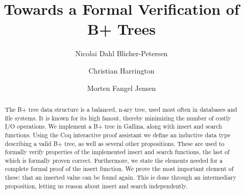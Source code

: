 \documentclass[oribibl]{llncs}
\begin{document}
\mainmatter
\title{Towards a Formal Verification of B+ Trees}
\author{Nicolai Dahl Blicher-Petersen \and Christian Harrington \and Morten Fangel Jensen \\
}

\maketitle

\begin{abstract}
The B+ tree data structure is a balanced, n-ary tree, used most often in databases and file systems. It is known for its high fanout, thereby minimizing the number of costly I/O operations. We implement a B+ tree in Gallina, along with insert and search functions. Using the Coq interactive proof assistant we define an inductive data type describing a valid B+ tree, as well as several other propositions. These are used to formally verify properties of the implemented insert and search functions, the last of which is formally proven correct. Furthermore, we state the elements needed for a complete formal proof of the insert function. We prove the most important element of these: that an inserted value can be found again. This is done through an intermediary proposition, letting us reason about insert and search independently.

\end{abstract}









\newpage

\end{document}
